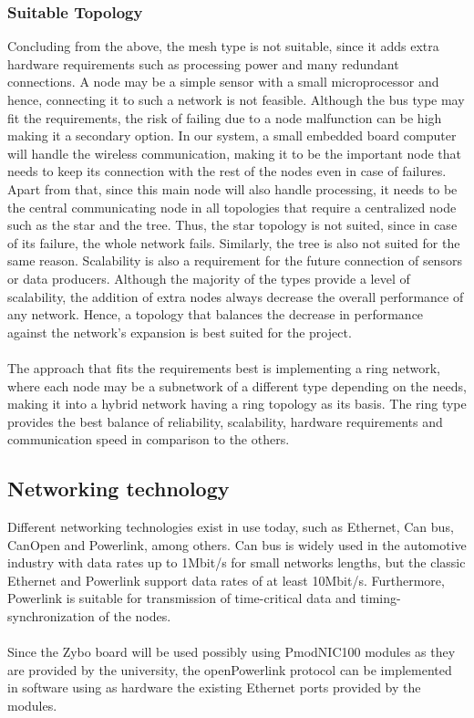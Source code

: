 \subsubsection{Suitable Topology}
Concluding from the above, the mesh type is not suitable, since it adds extra hardware requirements such as processing power and many redundant connections. A node may be a simple sensor with a small microprocessor and hence, connecting it to such a network is not feasible. Although the bus type may fit the requirements, the risk of failing due to a node malfunction can be high making it a secondary option. In our system, a small embedded board computer will handle the wireless communication, making it to be the important node that needs to keep its connection with the rest of the nodes even in case of failures. Apart from that, since this main node will also handle processing, it needs to be the central communicating node in all topologies that require a centralized node such as the star and the tree. Thus, the star topology is not suited, since in case of its failure, the whole network fails. Similarly, the tree is also not suited for the same reason. Scalability is also a requirement for the future connection of sensors or data producers. Although the majority of the types provide a level of scalability, the addition of extra nodes always decrease the overall performance of any network. Hence, a topology that balances the decrease in performance against the network's expansion is best suited for the project.\\\\
The approach that fits the requirements best is implementing a ring network, where each node may be a subnetwork of a different type depending on the needs, making it into a hybrid network having a ring topology as its basis. The ring type provides the best balance of reliability, scalability, hardware requirements and communication speed in comparison to the others.

\subsection{Networking technology}

Different networking technologies exist in use today, such as Ethernet, Can bus, CanOpen and Powerlink, among others. Can bus is widely used in the automotive industry with data rates up to 1Mbit/s for small networks lengths, but the classic Ethernet and Powerlink support data rates of at least 10Mbit/s. Furthermore, Powerlink is suitable for transmission of time-critical data and timing-synchronization of the nodes. 
\\\\
Since the Zybo board will be used possibly using PmodNIC100 modules as they are provided by the university, the openPowerlink protocol can be implemented in software using as hardware the existing Ethernet ports provided by the modules.





